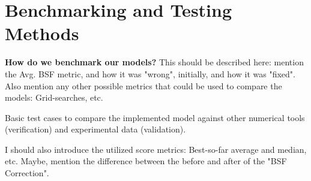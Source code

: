\section{Benchmarking and Testing Methods}
\label{section:Benchmarking_Testing}

\textbf{How do we benchmark our models?} This should be described here: mention the Avg. BSF metric, and how it was "wrong", initially, and how it was "fixed". Also mention any other possible metrics that could be used to compare the models: Grid-searches, etc.

Basic test cases to compare the implemented model against other numerical tools (verification) and experimental data (validation).

I should also introduce the utilized score metrics: Best-so-far average and median, etc. Maybe, mention the difference between the before and after of the "BSF Correction".  

